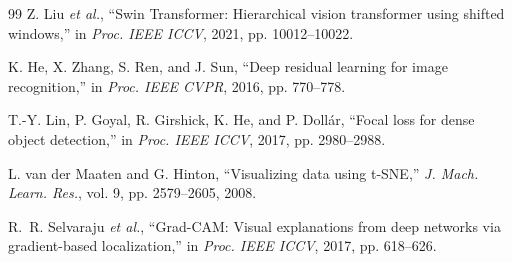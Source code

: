 \begin{thebibliography}{99}
Z. Liu \emph{et al.}, ``Swin Transformer: Hierarchical vision transformer using shifted windows,'' in \emph{Proc. IEEE ICCV}, 2021, pp. 10012--10022.

K. He, X. Zhang, S. Ren, and J. Sun, ``Deep residual learning for image recognition,'' in \emph{Proc. IEEE CVPR}, 2016, pp. 770--778.

T.-Y. Lin, P. Goyal, R. Girshick, K. He, and P. Doll\'ar, ``Focal loss for dense object detection,'' in \emph{Proc. IEEE ICCV}, 2017, pp. 2980--2988.

L. van der Maaten and G. Hinton, ``Visualizing data using t-SNE,'' \emph{J. Mach. Learn. Res.}, vol. 9, pp. 2579--2605, 2008.

R.~R. Selvaraju \emph{et al.}, ``Grad-CAM: Visual explanations from deep networks via gradient-based localization,'' in \emph{Proc. IEEE ICCV}, 2017, pp. 618--626.

\end{thebibliography}
